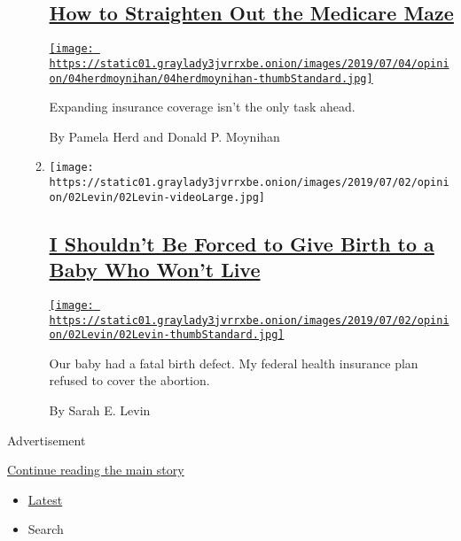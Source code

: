 \begin{enumerate}
\begin{enumerate}
{    \subsection{\texorpdfstring{\href{/2019/07/04/opinion/medicare-for-all.html}{How
    to Straighten Out the Medicare
    Maze}}{How to Straighten Out the Medicare Maze}}\label{how-to-straighten-out-the-medicare-maze}}

    \href{/2019/07/04/opinion/medicare-for-all.html}{\texttt{[image: https://static01.graylady3jvrrxbe.onion/images/2019/07/04/opinion/04herdmoynihan/04herdmoynihan-thumbStandard.jpg]}}

    Expanding insurance coverage isn't the only task ahead.

    By Pamela Herd and Donald P. Moynihan
  \item
    \texttt{[image: https://static01.graylady3jvrrxbe.onion/images/2019/07/02/opinion/02Levin/02Levin-videoLarge.jpg]}

    \hypertarget{i-shouldnt-be-forced-to-give-birth-to-a-baby-who-wont-live}{%
    \subsection{\texorpdfstring{\href{/2019/07/03/opinion/abortion-hyde-amendment.html}{I
    Shouldn't Be Forced to Give Birth to a Baby Who Won't
    Live}}{I Shouldn't Be Forced to Give Birth to a Baby Who Won't Live}}\label{i-shouldnt-be-forced-to-give-birth-to-a-baby-who-wont-live}}

    \href{/2019/07/03/opinion/abortion-hyde-amendment.html}{\texttt{[image: https://static01.graylady3jvrrxbe.onion/images/2019/07/02/opinion/02Levin/02Levin-thumbStandard.jpg]}}

    Our baby had a fatal birth defect. My federal health insurance plan
    refused to cover the abortion.

    By Sarah E. Levin
  \end{enumerate}
\end{enumerate}

Advertisement

\protect\hyperlink{after-mid1}{Continue reading the main story}

\begin{itemize}
\tightlist
\item
  \protect\hyperlink{stream-panel}{Latest}
\item
  Search
\end{itemize}

